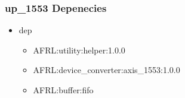 \subsubsection{up\_1553 Depenecies}
\begin{itemize}
\item dep
	\begin{itemize}
	\item AFRL:utility:helper:1.0.0
	\item AFRL:device\_converter:axis\_1553:1.0.0
	\item AFRL:buffer:fifo
	\end{itemize}
\end{itemize}
